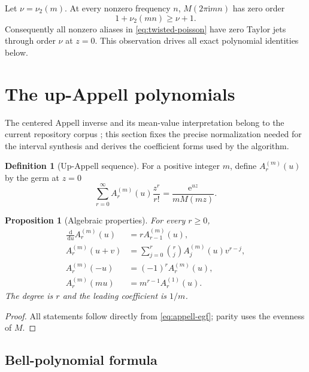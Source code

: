 \documentclass[11pt,oneside]{article}
\newtheorem{proposition}[theorem]{Proposition}
\theoremstyle{definition}
\newtheorem{definition}[theorem]{Definition}
\theoremstyle{remark}
\newcommand{\vtwo}{\nu_2}
\newcommand{\dd}{\,\mathrm d}
\newcommand{\e}{\mathrm e}
\newcommand{\ii}{\mathrm i}
\begin{document}
Let \(\nu=\vtwo(m)\).  At every nonzero frequency \(n\),
\(M(2\pi\ii mn)\) has zero order
\[
 1+\vtwo(mn)\ge\nu+1.
\]
Consequently all nonzero aliases in \eqref{eq:twisted-poisson} have zero Taylor
jets through order \(\nu\) at \(z=0\).  This observation drives all exact
polynomial identities below.

\section{The up-Appell polynomials}
\label{sec:appell}

The centered Appell inverse and its mean-value interpretation belong to the
current repository corpus \cite{repo-sampling}; this section fixes the precise
normalization needed for the interval synthesis and derives the coefficient
forms used by the algorithm.

\begin{definition}[Up-Appell sequence]
\label{def:appell}
For a positive integer \(m\), define \(A_r^{(m)}(u)\) by the germ at \(z=0\)
\begin{equation}
 \boxed{\displaystyle
 \sum_{r=0}^{\infty}A_r^{(m)}(u)\frac{z^r}{r!}
 =\frac{\e^{uz}}{mM(mz)}.}
 \label{eq:appell-egf}
\end{equation}
\end{definition}

\begin{proposition}[Algebraic properties]
\label{prop:appell-properties}
For every \(r\ge0\),
\begin{align}
 \frac{\dd}{\dd u}A_r^{(m)}(u)&=rA_{r-1}^{(m)}(u),\label{eq:appell-derivative}\\
 A_r^{(m)}(u+v)&=\sum_{j=0}^{r}\binom rj A_j^{(m)}(u)v^{r-j},\label{eq:appell-binomial}\\
 A_r^{(m)}(-u)&=(-1)^rA_r^{(m)}(u),\label{eq:appell-parity}\\
 A_r^{(m)}(m u)&=m^{r-1}A_r^{(1)}(u).\label{eq:appell-scaling}
\end{align}
The degree is \(r\) and the leading coefficient is \(1/m\).
\end{proposition}

\begin{proof}
All statements follow directly from \eqref{eq:appell-egf}; parity uses the
evenness of \(M\).
\end{proof}

\subsection{Bell-polynomial formula}
\end{document}
